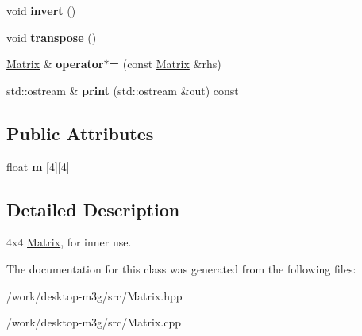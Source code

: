\begin{CompactItemize}
\item 
\hypertarget{classm3g_1_1Matrix_7fa1616cc61c19a5efcc863c950f7f30}{
void \textbf{invert} ()}
\label{classm3g_1_1Matrix_7fa1616cc61c19a5efcc863c950f7f30}

\item 
\hypertarget{classm3g_1_1Matrix_f3a99ffb20127be48232d12260e934dc}{
void \textbf{transpose} ()}
\label{classm3g_1_1Matrix_f3a99ffb20127be48232d12260e934dc}

\item 
\hypertarget{classm3g_1_1Matrix_5d28596666a27f88d74bacceaef9b326}{
\hyperlink{classm3g_1_1Matrix}{Matrix} \& \textbf{operator$\ast$=} (const \hyperlink{classm3g_1_1Matrix}{Matrix} \&rhs)}
\label{classm3g_1_1Matrix_5d28596666a27f88d74bacceaef9b326}

\item 
\hypertarget{classm3g_1_1Matrix_6fea17fa1532df3794f8cb39cb4f911f}{
std::ostream \& \textbf{print} (std::ostream \&out) const }
\label{classm3g_1_1Matrix_6fea17fa1532df3794f8cb39cb4f911f}

\end{CompactItemize}
\subsection*{Public Attributes}
\begin{CompactItemize}
\item 
\hypertarget{classm3g_1_1Matrix_7cdab8754cd800b1ba4008e559aa314c}{
float \textbf{m} \mbox{[}4\mbox{]}\mbox{[}4\mbox{]}}
\label{classm3g_1_1Matrix_7cdab8754cd800b1ba4008e559aa314c}

\end{CompactItemize}


\subsection{Detailed Description}
4x4 \hyperlink{classm3g_1_1Matrix}{Matrix}, for inner use. 

The documentation for this class was generated from the following files:\begin{CompactItemize}
\item 
/work/desktop-m3g/src/Matrix.hpp\item 
/work/desktop-m3g/src/Matrix.cpp\end{CompactItemize}
